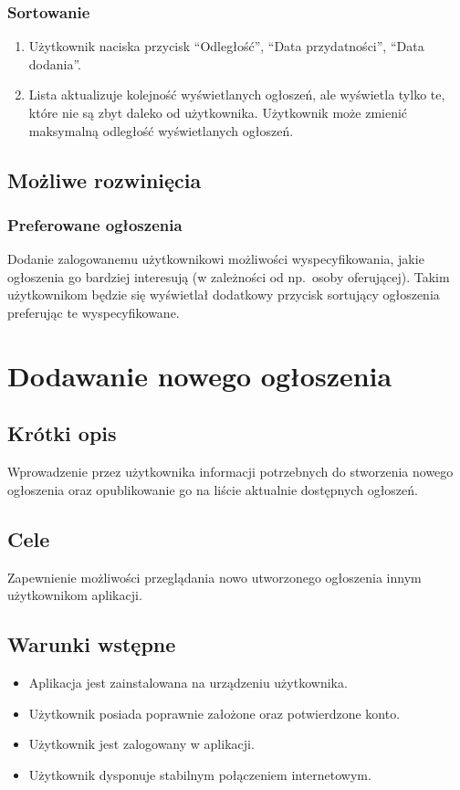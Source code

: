 \documentclass[12pt,a4paper,twoside]{article}
\begin{document}
    \subsubsection{Sortowanie}


    \begin{enumerate}
        \item Użytkownik naciska przycisk ``Odległość'', ``Data przydatności'', ``Data dodania''.
        \item Lista aktualizuje kolejność wyświetlanych ogłoszeń, ale wyświetla tylko te, które nie są zbyt daleko od użytkownika. Użytkownik może zmienić maksymalną odległość wyświetlanych ogłoszeń.
    \end{enumerate}


    \subsection{Możliwe rozwinięcia}
    \subsubsection{Preferowane ogłoszenia}
    Dodanie zalogowanemu użytkownikowi możliwości wyspecyfikowania, jakie ogłoszenia go bardziej interesują (w zależności od np.\ osoby oferującej). Takim użytkownikom będzie się wyświetlał dodatkowy przycisk sortujący ogłoszenia preferując te wyspecyfikowane.


    \section{Dodawanie nowego ogłoszenia}


    \subsection{Krótki opis}
    Wprowadzenie przez użytkownika informacji potrzebnych do stworzenia nowego ogłoszenia oraz opublikowanie go na liście aktualnie dostępnych
    ogłoszeń.


    \subsection{Cele}
    Zapewnienie możliwości przeglądania nowo utworzonego ogłoszenia innym użytkownikom aplikacji.


    \subsection{Warunki wstępne}
    \begin{itemize}
        \item Aplikacja jest zainstalowana na urządzeniu użytkownika.
        \item Użytkownik posiada poprawnie założone oraz potwierdzone konto.
        \item Użytkownik jest zalogowany w aplikacji.
        \item Użytkownik dysponuje stabilnym połączeniem internetowym.
    \end{itemize}
\end{document}
